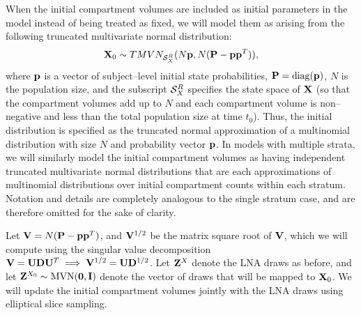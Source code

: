 When the initial compartment volumes are included as initial parameters in the model instead of being treated as fixed, we will model them as arising from the following truncated multivariate normal distribution: \begin{equation}
\label{eqn:lna_initdist_prior}
\mathbf{X}_0 \sim TMVN_{\mathcal{S}_X^R}(N\mathbf{p},N(\mathbf{P} - \mathbf{p}\mathbf{p}^T)),
\end{equation} 
where $ \mathbf{p} $ is a vector of subject--level initial state probabilities, $ \mathbf{P} = \mathrm{diag}(\mathbf{p}) $, $ N $ is the population size, and the subscript $ \mathcal{S}_X^R $ specifies the state space of $ \mathbf{X} $ (so that the compartment volumes add up to $ N $ and each compartment volume is non--negative and less than the total population size at time $ t_0 $). Thus, the initial distribution is specified as the truncated normal approximation of a multinomial distribution with size $ N $ and probability vector $ \mathbf{p} $. In models with multiple strata, we will similarly model the initial compartment volumes as having independent truncated multivariate normal distributions that are each approximations of multinomial distributions over initial compartment counts within each stratum. Notation and details are completely analogous to the single stratum case, and are therefore omitted for the sake of clarity.

Let $ \mathbf{V} = N(\mathbf{P} - \mathbf{p}\mathbf{p}^T) $, and $ \mathbf{V}^{1/2} $ be the matrix square root of $ \mathbf{V} $, which we will compute using the singular value decomposition $ \mathbf{V} = \mathbf{U}\mathbf{D}\mathbf{U}^T \implies \mathbf{V}^{1/2} = \mathbf{U}\mathbf{D}^{1/2}$. Let $ \mathbf{Z}^X $ denote the LNA draws as before, and let $ \mathbf{Z}^{X_0}\sim\mathrm{MVN}(\boldsymbol{0},\mathbf{I}) $ denote the vector of draws that will be mapped to $ \mathbf{X}_0 $. We will update the initial compartment volumes jointly with the LNA draws using elliptical slice sampling.

